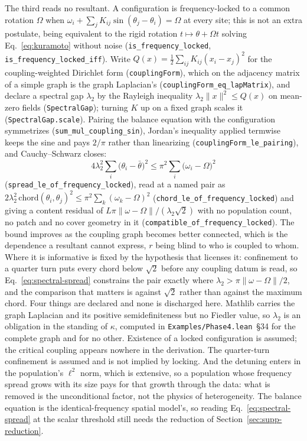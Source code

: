 \documentclass{article}
\begin{document}
The third reads no resultant. A configuration is frequency-locked to a common
rotation $\Omega$ when $\omega_i+\sum_j K_{ij}\sin(\theta_j-\theta_i)=\Omega$ at
every site; this is not an extra postulate, being equivalent to the rigid
rotation $t\mapsto\theta+\Omega t$ solving Eq.~\eqref{eq:kuramoto} without noise
(\nolinkurl{is_frequency_locked},
\nolinkurl{is_frequency_locked_iff}). Write
$Q(x)=\frac12\sum_{ij}K_{ij}(x_i-x_j)^2$ for the coupling-weighted Dirichlet form
(\texttt{couplingForm}), which on the adjacency matrix of a simple graph is the
graph Laplacian's
(\nolinkurl{couplingForm_eq_lapMatrix}), and declare a
spectral gap $\lambda_2$ by the Rayleigh inequality
$\lambda_2\lVert x\rVert^{2}\le Q(x)$ on mean-zero fields
(\texttt{SpectralGap}); turning $K$ up on a fixed graph scales it
(\texttt{SpectralGap.scale}). Pairing the balance equation with the
configuration symmetrizes
(\nolinkurl{sum_mul_coupling_sin}), Jordan's
inequality applied termwise keeps the sine and pays $2/\pi$ rather than
linearizing
(\nolinkurl{couplingForm_le_pairing}), and
Cauchy--Schwarz closes:
\begin{equation}
 4\lambda_2^{2}\sum_i\bigl(\theta_i-\bar\theta\bigr)^{2}
 \le\pi^{2}\sum_i\bigl(\omega_i-\Omega\bigr)^{2}
 \label{eq:spectral-spread}
\end{equation}
(\nolinkurl{spread_le_of_frequency_locked}),
read at a named pair as
$2\lambda_2^{2}\,\mathrm{chord}(\theta_i,\theta_j)^{2}\le\pi^{2}\sum_k(\omega_k-\Omega)^{2}$
(\nolinkurl{chord_le_of_frequency_locked})
and giving a content residual of
$L\pi\lVert\omega-\Omega\rVert/(\lambda_2\sqrt{2})$ with no population count, no
patch and no cover geometry in it
(\nolinkurl{compatible_of_frequency_locked}).
The bound improves as the coupling graph becomes better connected, which is the
dependence a resultant cannot express, $r$ being blind to who is coupled to
whom. Where it is informative is fixed by the hypothesis that licenses it:
confinement to a quarter turn puts every chord below $\sqrt2$ before any
coupling datum is read, so Eq.~\eqref{eq:spectral-spread} constrains the pair
exactly where $\lambda_2>\pi\lVert\omega-\Omega\rVert/2$, and the comparison
that matters is against $\sqrt2$ rather than against the maximum chord. Four
things are declared and none is discharged here. Mathlib carries the
graph Laplacian and its positive semidefiniteness but no Fiedler value, so
$\lambda_2$ is an obligation in the standing of $\kappa$, computed in
\nolinkurl{Examples/Phase4.lean}~\S34 for the complete graph and for no
other. Existence of a locked configuration is assumed; the critical coupling
appears nowhere in the derivation. The quarter-turn confinement is assumed and
is not implied by locking. And the detuning enters in the population's $\ell^2$
norm, which is extensive, so a population whose frequency spread grows with its
size pays for that growth through the data: what is removed is the unconditional
factor, not the physics of heterogeneity. The balance equation is the
identical-frequency spatial model's, so reading Eq.~\eqref{eq:spectral-spread} at
the scalar threshold still needs the reduction of Section~\ref{sec:supp-reduction}.
\end{document}
